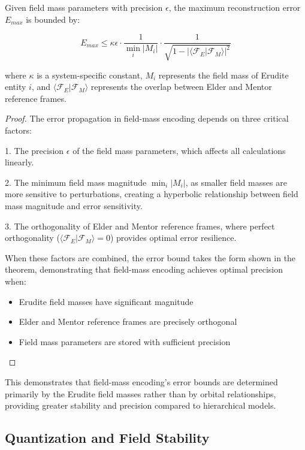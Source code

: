 \begin{theorem}
Given field mass parameters with precision $\epsilon$, the maximum reconstruction error $E_{max}$ is bounded by:

\begin{equation}
E_{max} \leq \kappa \epsilon \cdot \frac{1}{\min_i |M_i|} \cdot \frac{1}{\sqrt{1 - |\langle \mathcal{F}_E|\mathcal{F}_M \rangle|^2}}
\end{equation}

where $\kappa$ is a system-specific constant, $M_i$ represents the field mass of Erudite entity $i$, and $\langle \mathcal{F}_E|\mathcal{F}_M \rangle$ represents the overlap between Elder and Mentor reference frames.
\end{theorem}

\begin{proof}
The error propagation in field-mass encoding depends on three critical factors:

1. The precision $\epsilon$ of the field mass parameters, which affects all calculations linearly.

2. The minimum field mass magnitude $\min_i |M_i|$, as smaller field masses are more sensitive to perturbations, creating a hyperbolic relationship between field mass magnitude and error sensitivity.

3. The orthogonality of Elder and Mentor reference frames, where perfect orthogonality ($\langle \mathcal{F}_E|\mathcal{F}_M \rangle = 0$) provides optimal error resilience.

When these factors are combined, the error bound takes the form shown in the theorem, demonstrating that field-mass encoding achieves optimal precision when:
\begin{itemize}
    \item Erudite field masses have significant magnitude
    \item Elder and Mentor reference frames are precisely orthogonal
    \item Field mass parameters are stored with sufficient precision
\end{itemize}
\end{proof}

This demonstrates that field-mass encoding's error bounds are determined primarily by the Erudite field masses rather than by orbital relationships, providing greater stability and precision compared to hierarchical models.

\subsection{Quantization and Field Stability}

